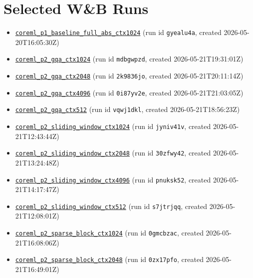 \documentclass[11pt]{article}
\begin{document}
\section{Selected W\&B Runs}
\footnotesize
\begin{itemize}
\item \href{https://wandb.ai/krishsachdev246-bits-pilani/saidl-core-ml/runs/gyealu4a}{\texttt{coreml\_p1\_baseline\_full\_abs\_ctx1024}} (run id \texttt{gyealu4a}, created 2026-05-20T16:05:30Z)
\item \href{https://wandb.ai/krishsachdev246-bits-pilani/saidl-core-ml/runs/mdbgwpzd}{\texttt{coreml\_p2\_gqa\_ctx1024}} (run id \texttt{mdbgwpzd}, created 2026-05-21T19:31:01Z)
\item \href{https://wandb.ai/krishsachdev246-bits-pilani/saidl-core-ml/runs/2k9836jo}{\texttt{coreml\_p2\_gqa\_ctx2048}} (run id \texttt{2k9836jo}, created 2026-05-21T20:11:14Z)
\item \href{https://wandb.ai/krishsachdev246-bits-pilani/saidl-core-ml/runs/0i87yv2e}{\texttt{coreml\_p2\_gqa\_ctx4096}} (run id \texttt{0i87yv2e}, created 2026-05-21T21:03:05Z)
\item \href{https://wandb.ai/krishsachdev246-bits-pilani/saidl-core-ml/runs/vqwj1dkl}{\texttt{coreml\_p2\_gqa\_ctx512}} (run id \texttt{vqwj1dkl}, created 2026-05-21T18:56:23Z)
\item \href{https://wandb.ai/krishsachdev246-bits-pilani/saidl-core-ml/runs/jyniv41v}{\texttt{coreml\_p2\_sliding\_window\_ctx1024}} (run id \texttt{jyniv41v}, created 2026-05-21T12:43:44Z)
\item \href{https://wandb.ai/krishsachdev246-bits-pilani/saidl-core-ml/runs/30zfwy42}{\texttt{coreml\_p2\_sliding\_window\_ctx2048}} (run id \texttt{30zfwy42}, created 2026-05-21T13:24:48Z)
\item \href{https://wandb.ai/krishsachdev246-bits-pilani/saidl-core-ml/runs/pnuksk52}{\texttt{coreml\_p2\_sliding\_window\_ctx4096}} (run id \texttt{pnuksk52}, created 2026-05-21T14:17:47Z)
\item \href{https://wandb.ai/krishsachdev246-bits-pilani/saidl-core-ml/runs/s7jtrjqq}{\texttt{coreml\_p2\_sliding\_window\_ctx512}} (run id \texttt{s7jtrjqq}, created 2026-05-21T12:08:01Z)
\item \href{https://wandb.ai/krishsachdev246-bits-pilani/saidl-core-ml/runs/0gmcbzac}{\texttt{coreml\_p2\_sparse\_block\_ctx1024}} (run id \texttt{0gmcbzac}, created 2026-05-21T16:08:06Z)
\item \href{https://wandb.ai/krishsachdev246-bits-pilani/saidl-core-ml/runs/0zx17pfo}{\texttt{coreml\_p2\_sparse\_block\_ctx2048}} (run id \texttt{0zx17pfo}, created 2026-05-21T16:49:01Z)

\end{itemize}
\end{document}
